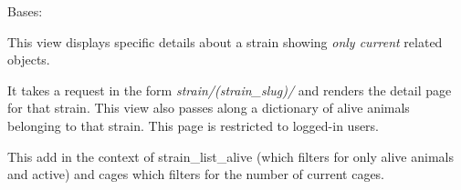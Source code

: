 \documentclass[letterpaper,10pt,english]{sphinxmanual}
\begin{document}

\begin{fulllineitems}
\label{api:mousedb.animal.views.StrainDetail}
Bases: {\hyperref[api:mousedb.views.ProtectedDetailView]{}}

This view displays specific details about a strain showing \emph{only current} related objects.

It takes a request in the form \emph{strain/(strain\_slug)/} and renders the detail page for that strain.
This view also passes along a dictionary of alive animals belonging to that strain.
This page is restricted to logged-in users.

\begin{fulllineitems}
\label{api:mousedb.animal.views.StrainDetail.context_object_name}
\end{fulllineitems}


\begin{fulllineitems}
\label{api:mousedb.animal.views.StrainDetail.get_context_data}
This add in the context of strain\_list\_alive (which filters for only alive animals and active) and cages which filters for the number of current cages.

\end{fulllineitems}


\begin{fulllineitems}
\label{api:mousedb.animal.views.StrainDetail.queryset}
\end{fulllineitems}


\begin{fulllineitems}
\label{api:mousedb.animal.views.StrainDetail.slug_field}
\end{fulllineitems}


\begin{fulllineitems}
\label{api:mousedb.animal.views.StrainDetail.template_name}
\end{fulllineitems}


\end{fulllineitems}
\end{document}
